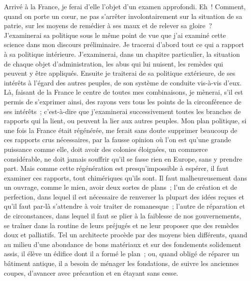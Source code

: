 \documentclass[french,twoside]{book} %
\begin{document}
Arrivé à la France, je ferai d’elle l’objet d’un examen approfondi. Eh ! Comment, quand on porte un cœur, ne pas s’arrêter involontairement sur la situation de sa patrie, sur les moyens de remédier à ses maux et de relever sa gloire ? J’examinerai sa politique sous le même point de vue que j’ai examiné cette science dans mon discours préliminaire. Je tracerai d’abord tout ce qui a rapport à sa politique intérieure. J’examinerai, dans un chapitre particulier, la situation de chaque objet d’administration, les abus qui lui nuisent, les remèdes qui peuvent y être appliqués. Ensuite je traiterai de sa politique extérieure, de ses intérêts à l’égard des autres peuples, de son système de conduite vis-à-vis d’eux. Là, faisant de la France le centre de toutes mes combinaisons, je mènerai, s’il est permis de s’exprimer ainsi, des rayons vers tous les points de la circonférence de ses intérêts ; c’est-à-dire que j’examinerai successivement toutes les branches de rapports qui la lient, ou peuvent la lier aux autres peuples. Mon plan politique, si une fois la France était régénérée, me ferait sans doute supprimer beaucoup de ces rapports crus nécessaires, par la fausse opinion où l’on est qu’une grande puissance comme elle, doit avoir des colonies éloignées, un commerce considérable, ne doit jamais souffrir qu’il se fasse rien en Europe, sans y prendre part. Mais comme cette régénération est presqu’impossible à espérer, il faut examiner ces rapports, tout chimériques qu’ils sont. Il faut malheureusement dans un ouvrage, comme le mien, avoir deux sortes de plans ; l’un de création et de perfection, dans lequel il est nécessaire de renverser la plupart des idées reçues et qu’il faut par-là s’attendre à voir traiter de romanesque ; l’autre de réparation et de circonstances, dans lequel il faut se plier à la faiblesse de nos gouvernements, se traîner dans la routine de leurs préjugés et ne leur proposer que des remèdes doux et palliatifs. Tel un architecte procède par des moyens bien différents, quand au milieu d’une abondance de bons matériaux et sur des fondements solidement assis, il élève un édifice dont il a formé le plan ; ou, quand obligé de réparer un bâtiment antique, il a besoin de ménager les fondations, de suivre les anciennes coupes, d’avancer avec précaution et en étayant sans cesse.\par
\end{document}
